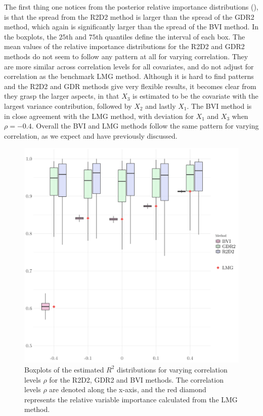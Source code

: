 \noindent The first thing one notices from the posterior relative importance distributions (), is that the spread from the R2D2 method is larger than the spread of the GDR2 method, which again is significantly larger than the spread of the BVI method. In the boxplots, the $25$th and $75$th quantiles define the interval of each box. The mean values of the relative importance distributions for the R2D2 and GDR2 methods do not seem to follow any pattern at all for varying correlation. They are more similar across correlation levels for all covariates, and do not adjust for correlation as the benchmark LMG method. Although it is hard to find patterns and the R2D2 and GDR methods give very flexible results, it becomes clear from they grasp the larger aspects, in that $X_3$ is estimated to be the covariate with the largest variance contribution, followed by $X_2$ and lastly $X_1$. The BVI method is in close agreement with the LMG method, with deviation for $X_1$ and $X_3$ when $\rho=-0.4$. Overall the BVI and LMG methods follow the same pattern for varying correlation, as we expect and have previously discussed.
\begin{figure}[H]%
  \centering
  \includegraphics[width=1\linewidth]{Figures/R2D2_BVI_Comparison/R2D2_BVI_R2_plot.png}
  \caption[Comparison of the marginal $R^2$ from the BVI method and the shrinkage prior methods]{Boxplots of the estimated $R^2$ distributions for varying correlation levels $\rho$ for the R2D2, GDR2 and BVI methods. The correlation levels $\rho$ are denoted along the x-axis, and the red diamond represents the relative variable importance calculated from the LMG method.}
  \label{fig:r2d2_r2}
\end{figure}
